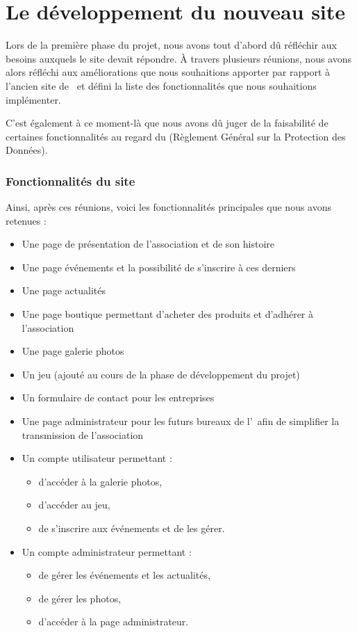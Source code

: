 \chapter{Le développement du nouveau site}
\label{chap:dev}

Lors de la première phase du projet, nous avons tout d'abord dû réfléchir aux besoins auxquels le site devait répondre.
À travers plusieurs réunions, nous avons alors réfléchi aux améliorations que nous souhaitions apporter par rapport à l’ancien site de \ofni\ et défini la liste des fonctionnalités que nous souhaitions implémenter.

C'est également à ce moment-là que nous avons dû juger de la faisabilité de certaines fonctionnalités au regard du  (Règlement Général sur la Protection des Données).

\subsection{Fonctionnalités du site}
\label{subsec:fonctionnalites}

Ainsi, après ces réunions, voici les fonctionnalités principales que nous avons retenues :

\begin{itemize}
    \item Une page de présentation de l'association et de son histoire
    \item Une page événements et la possibilité de s'inscrire à ces derniers
    \item Une page actualités
    \item Une page boutique permettant d'acheter des produits et d'adhérer à l'association
    \item Une page galerie photos
    \item Un jeu (ajouté au cours de la phase de développement du projet)
    \item Un formulaire de contact pour les entreprises
    \item Une page administrateur pour les futurs bureaux de l'\ofni\ afin de simplifier la transmission de l'association
    \item Un compte utilisateur permettant :
    \begin{itemize}
        \item d'accéder à la galerie photos,
        \item d'accéder au jeu,
        \item de s'inscrire aux événements et de les gérer.
    \end{itemize}
    \item Un compte administrateur permettant :
    \begin{itemize}
        \item de gérer les événements et les actualités,
        \item de gérer les photos,
        \item d'accéder à la page administrateur.
    \end{itemize}
\end{itemize}

